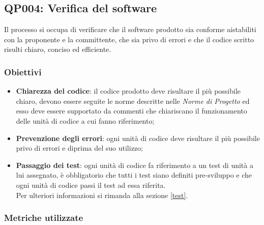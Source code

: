 \subsection{QP004: Verifica del software}\label{pro4}
Il processo si occupa di verificare che il software prodotto sia conforme aistabiliti con la proponente e la committente, che sia privo di errori e che il codice scritto risulti chiaro, conciso ed efficiente.
\subsubsection{Obiettivi}
\begin{itemize}
	\item \textbf{Chiarezza del codice}: il codice prodotto deve risultare il più possibile chiaro, devono essere seguite le norme descritte nelle \textit{Norme di Progetto} ed esso deve essere supportato da commenti che chiariscano il funzionamento delle unità di codice a cui fanno riferimento;
	\item \textbf{Prevenzione degli errori}: ogni unità di codice deve risultare il più possibile privo di errori e diprima del suo utilizzo;
	\item \textbf{Passaggio dei test}: ogni unità di codice fa riferimento a un test di unità a lui assegnato, è obbligatorio che tutti i test siano definiti pre-sviluppo e che ogni unità di codice passi il test ad essa riferita.\\
	Per ulteriori informazioni si rimanda alla sezione \ref{test}.
\end{itemize}
\subsubsection{Metriche utilizzate}


